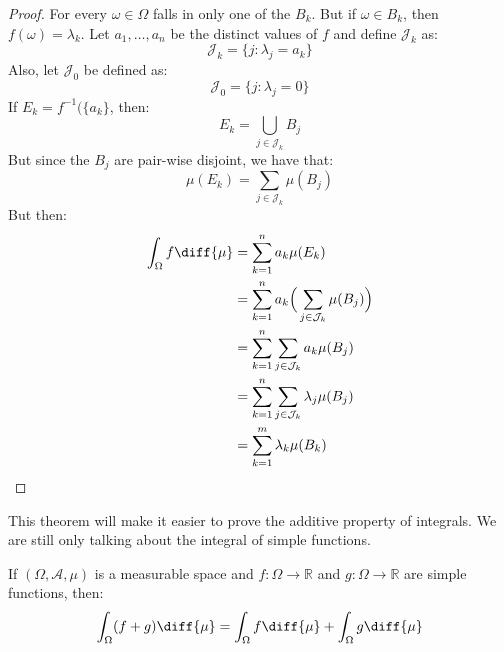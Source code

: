     \begin{proof}
        For every $\omega\in\Omega$ falls in only one of the $B_{k}$. But if
        $\omega\in{B}_{k}$, then $f(\omega)=\lambda_{k}$. Let
        $a_{1},\hdots,a_{n}$ be the distinct values of $f$ and define
        $\mathcal{J}_{k}$ as:
        \begin{equation}
            \mathcal{J}_{k}=\{j:\lambda_{j}=a_{k}\}
        \end{equation}
        Also, let $\mathcal{J}_{0}$ be defined as:
        \begin{equation}
            \mathcal{J}_{0}=\{j:\lambda_{j}=0\}
        \end{equation}
        If $E_{k}=f^{-1}(\{a_{k}\}$, then:
        \begin{equation}
            E_{k}=\bigcup_{j\in\mathcal{J}_{k}}B_{j}
        \end{equation}
        But since the $B_{j}$ are pair-wise disjoint, we have that:
        \begin{equation}
            \mu(E_{k})=\sum_{j\in\mathcal{J}_{k}}\mu(B_{j})
        \end{equation}
        But then:
        \begin{align}
            \int_{\Omega}f\diff{\mu}
            &=\sum_{k=1}^{n}a_{k}\mu(E_{k})\\
            &=\sum_{k=1}^{n}a_{k}
                \Big(\sum_{j\in\mathcal{J}_{k}}\mu(B_{j})\Big)\\
            &=\sum_{k=1}^{n}\sum_{j\in\mathcal{J}_{k}}a_{k}\mu(B_{j})\\
            &=\sum_{k=1}^{n}\sum_{j\in\mathcal{J}_{k}}\lambda_{j}\mu(B_{j})\\
            &=\sum_{k=1}^{m}\lambda_{k}\mu(B_{k})
        \end{align}
    \end{proof}
    This theorem will make it easier to prove the additive property of
    integrals. We are still only talking about the integral of simple functions.
    \begin{theorem}
        If $(\Omega,\mathcal{A},\mu)$ is a measurable space and
        $f:\Omega\rightarrow\mathbb{R}$ and $g:\Omega\rightarrow\mathbb{R}$ are
        simple functions, then:
        \begin{equation}
            \int_{\Omega}(f+g)\diff{\mu}
            =\int_{\Omega}f\diff{\mu}+\int_{\Omega}g\diff{\mu}
        \end{equation}
    \end{theorem}
